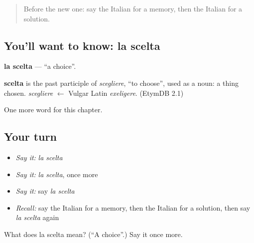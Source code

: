 \begin{quote}
Before the new one: say the Italian for a memory, then the Italian for a solution.
\end{quote}

\subsection*{You'll want to know: la scelta}
\textbf{la scelta} — \textquotedblleft{}a choice\textquotedblright{}.

\begin{cousinweb}
\textbf{scelta} is the past participle of \emph{scegliere}, \textquotedblleft{}to choose\textquotedblright{}, used as a noun: a thing chosen. \emph{scegliere} $\leftarrow$ Vulgar Latin \emph{exeligere}. (EtymDB 2.1)
\end{cousinweb}

\begin{grammarlens}[title={What you've built}]
One more word for this chapter.
\end{grammarlens}

\subsection*{Your turn}
\begin{itemize}
\raggedright
  \item \emph{Say it:} \emph{la scelta}
  \item \emph{Say it:} \emph{la scelta}, once more
  \item \emph{Say it:} say \emph{la scelta}
  \item \emph{Recall:} say the Italian for a memory, then the Italian for a solution, then say \emph{la scelta} again
\end{itemize}

\begin{tcolorbox}[breakable,colback=teal!4,colframe=teal!35!black,title={Before you move on}]
What does la scelta mean? (\textquotedblleft{}A choice\textquotedblright{}.) Say it once more.
\end{tcolorbox}
